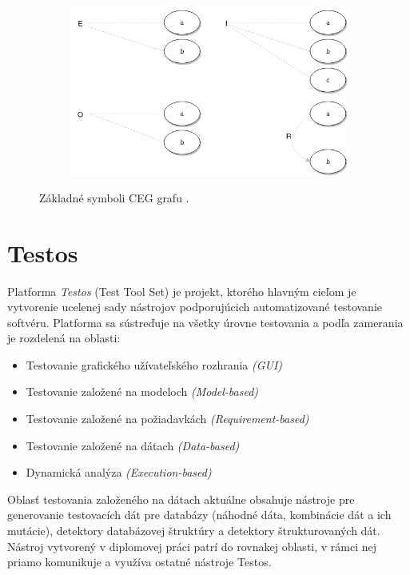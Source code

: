 \begin{figure}[h]\centering
	\centering
	\includegraphics[width=4.5in,height=2.2in]{obrazky-figures/ceg_cons.png}\\[1pt]
	\caption{Základné symboli CEG grafu \cite{Ast}.}
	\label{ceg_cons_img}
\end{figure}

\section{Testos}
\label{Testos}
Platforma \textit{Testos} (Test Tool Set) \cite{Testos} je projekt, ktorého hlavným cieľom je vytvorenie ucelenej sady nástrojov podporujúcich automatizované testovanie softvéru. Platforma sa sústreďuje na všetky úrovne testovania a podľa zamerania je rozdelená na oblasti:
\begin{itemize}
	\item{Testovanie grafického užívateľského rozhrania \textit{(GUI)}
	}
	\item{Testovanie založené na modeloch \textit{(Model-based)}
	}
	\item{Testovanie založené na požiadavkách \textit{(Requirement-based)}
	} 	
	\item{Testovanie založené na dátach \textit{(Data-based)}
	} 	
	\item{Dynamická analýza \textit{(Execution-based)}
	} 	
\end{itemize}  
Oblasť testovania založeného na dátach aktuálne obsahuje nástroje pre generovanie testovacích dát pre databázy (náhodné dáta, kombinácie dát a ich mutácie), detektory databázovej štruktúry a detektory štrukturovaných dát. Nástroj vytvorený v diplomovej práci patrí do rovnakej oblasti, v rámci nej priamo komunikuje a využíva ostatné nástroje Testos.

